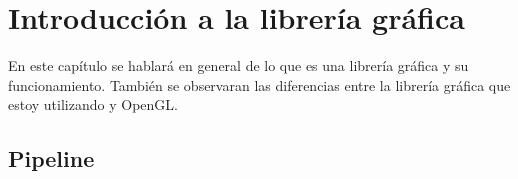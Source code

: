 \chapter{Introducción a la librería gráfica}
En este capítulo se hablará en general de lo que es una librería gráfica y su funcionamiento. También se observaran las diferencias entre la librería gráfica que estoy utilizando y OpenGL.
\section{Pipeline}

